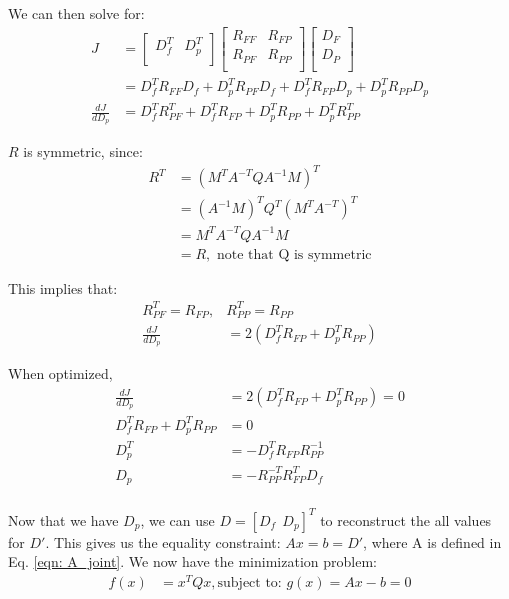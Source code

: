\documentclass[11pt]{article}
\begin{document}
We can then solve for:
\begin{align*}
J &= 
\begin{bmatrix} 
D_f^T & D_p^T \\
\end{bmatrix}
\begin{bmatrix}
R_{FF} & R_{FP} \\
R_{PF} & R_{PP} \\
\end{bmatrix} 
\begin{bmatrix}
D_F \\
D_P \\
\end{bmatrix} \\
&= D_f^T R_{FF} D_f + D_p^T R_{PF} D_f + D_f^T R_{FP} D_p + D_p^T R_{PP} D_p \\
\frac{dJ}{d D_p} &= D_f^T R_{PF}^T + D_f^T R_{FP} + D_p^T R_{PP} + D_p^T R_{PP}^T 
\end{align*} 

$R$ is symmetric, since:
\begin{align*}
R^T &= (M^T A^{-T} Q A^{-1}  M)^T \\
&= (A^{-1}  M)^T Q^T (M^T A^{-T})^T \\
&= M^T A^{-T} Q A^{-1}  M \\
&= R, \text{ note that Q is symmetric}
\end{align*}

This implies that:
\begin{align*}
R_{PF}^T = R_{FP}, & R_{PP}^T = R_{PP} \\
\frac{dJ}{d D_p} &= 2(D_f^T R_{FP} + D_p^T R_{PP})
\end{align*}

When optimized, 
\begin{align*}
\frac{dJ}{d D_p} &= 2(D_f^T R_{FP} + D_p^T R_{PP}) = 0 \\
D_f^T R_{FP} + D_p^T R_{PP} &= 0 \\
D_p^T &= -D_f^T R_{FP} R_{PP}^{-1} \\
D_p &= -R_{PP}^{-T} R_{FP}^T D_f \\
\end{align*}

Now that we have $D_p$, we can use $D = [D_f \ \ D_p]^T$ to reconstruct the all values for $D'$. This gives us the equality constraint: $Ax = b = D'$, where A is defined in Eq. \ref{eqn: A_joint}. We now have the minimization problem:
\begin{align*}
f(x) &= x^T Q x, \text{subject to: } g(x) = Ax-b = 0
\end{align*}
\end{document}
